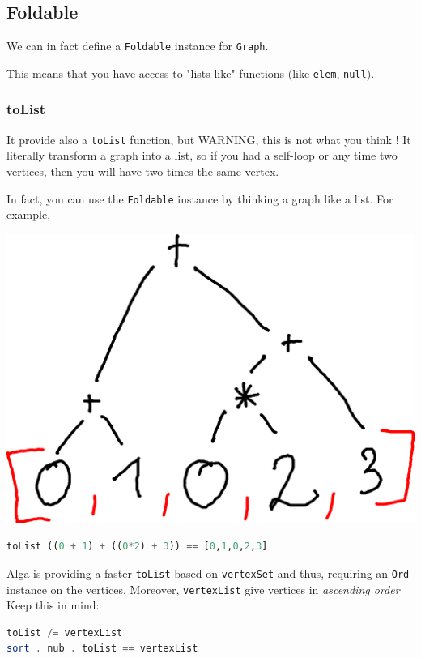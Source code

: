\documentclass[10pt,a4paper]{article}
\begin{document}
\subsection{Foldable}
We can in fact define a \verb|Foldable| instance for \verb|Graph|.

This means that you have access to "lists-like" functions (like \verb|elem|, \verb|null|). 

\subsubsection{toList}
It provide also a \verb|toList| function, but WARNING, this is not what you think ! It literally transform a graph into a list, so if you had a self-loop or any time two vertices, then you will have two times the same vertex.

In fact, you can use the \verb|Foldable| instance by thinking a graph like a list. For example, 

\begin{center}
	\includegraphics[scale=0.5]{figspng/foldable.png}
\end{center}

\begin{lstlisting}[language=Haskell, frame=single]
toList ((0 + 1) + ((0*2) + 3)) == [0,1,0,2,3]
\end{lstlisting}

Alga is providing a faster \verb|toList| based on \verb|vertexSet| and thus, requiring an \verb|Ord| instance on the vertices. Moreover, \verb|vertexList| give vertices in \emph{ascending order}
\\
Keep this in mind:
\begin{lstlisting}[language=Haskell, frame=single]
toList /= vertexList
sort . nub . toList == vertexList
\end{lstlisting}
\end{document}

